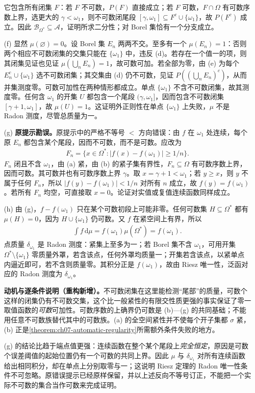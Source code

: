 \documentclass[../../main.tex]{subfiles}
\begin{document}
\begin{solution}
它包含所有闭集 $F$：若 $F$ 不可数，$P(F)$ 直接成立；若 $F$ 可数，$F\cap\Omega$ 有可数序数上界，选更大的 $\gamma<\omega_1$，则不可数闭尾段 $[\gamma,\omega_1]\subseteq F^c\cup\{\omega_1\}$，故 $P(F^c)$ 成立。因此 $\mathscr B_{\Omega^*}\subseteq\mathscr A$，证明所求二分性；对 Borel 集恰有一个分支成立。

(f) 显然 $\mu(\varnothing)=0$。设 Borel 集 $E_n$ 两两不交。至多有一个 $\mu(E_n)=1$：否则两个相应不可数闭集的交集只能在 $\{\omega_1\}$ 中，违反 (d)。若存在一个值一的项，则其闭集见证也见证 $\mu(\bigcup_nE_n)=1$，故可数可加。若全部为零，由 (e) 为每个 $E_n^c\cup\{\omega_1\}$ 选不可数闭集；其交集由 (d) 仍不可数，见证 $P((\bigcup_nE_n)^c)$，从而并集测度零。可数可加性在两种情形都成立。单点 $\{\omega_1\}$ 不含不可数闭集，故其测度零。任何含 $\omega_1$ 的开集 $U$ 都包含一个尾段 $(\gamma,\omega_1]$，因而包含不可数闭集 $[\gamma+1,\omega_1]$，故 $\mu(U)=1$。这证明外正则性在单点 $\{\omega_1\}$ 上失败，$\mu$ 不是 Radon 测度，尽管总质量为一。

(g) \textbf{原提示勘误。}原提示中的严格不等号 $<$ 方向错误：由 $f$ 在 $\omega_1$ 处连续，每个原 $E_n$ 都包含某个尾段，因而不可数，而不是可数。应改为
\begin{align*}
F_n=\{x\in\Omega^*:|f(x)-f(\omega_1)|\geqslant1/n\}.
\end{align*}
$F_n$ 闭且不含 $\omega_1$，由 (a) 紧，由 (b) 的紧子集有界性，$F_n\subseteq\Omega$ 有可数序数上界，因而可数。其可数并也有可数序数上界 $\gamma$。取 $x=\gamma+1<\omega_1$；若 $y\geqslant x$，则 $y$ 不属于任何 $F_n$，所以 $|f(y)-f(\omega_1)|<1/n$ 对所有 $n$ 成立，故 $f(y)=f(\omega_1)$。若所有 $F_n$ 均空，可直接取 $x=0$。论证对实值或复值连续函数同样成立。

(h) 由 (g)，$f-f(\omega_1)$ 只在某个可数初段上可能非零。任何可数集 $H\subseteq\Omega^*$ 都有 $\mu(H)=0$，因为 $H\cup\{\omega_1\}$ 仍可数。又 $f$ 在紧空间上有界，所以
\begin{align*}
\int f\,\mathrm d\mu=f(\omega_1)\mu(\Omega^*)=f(\omega_1).
\end{align*}
点质量 $\delta_{\omega_1}$ 是 Radon 测度：紧集上至多为一；若 Borel 集不含 $\omega_1$，可用开集 $\Omega^*\setminus\{\omega_1\}$ 零质量外罩，若含该点，任何外罩均质量一；开集若含该点，以紧单点内逼近即可，若不含则质量零。其积分正是 $f(\omega_1)$，故由 Riesz 唯一性，泛函对应的 Radon 测度为 $\delta_{\omega_1}$。
\end{solution}
\begin{remark}
\textbf{动机与逐条件说明（重构新增）。}不可数闭集在这里能检测“尾部”的质量，可数个这样的闭集仍有不可数交集，这个比一般紧性的有限交性质更强的事实保证了零一取值函数的\emph{可数}可加性。可数序数的上确界仍可数是 (b)—(g) 的共同基础；不能用任意不可数族替代其中的可数族。(a) 的全空间紧性并不使每个开子集都 $\sigma$ 紧，(b) 正是\cref{theorem:ch07-automatic-regularity}所需额外条件失败的地方。

(g) 的结论比趋于端点值更强：连续函数在整个某个尾段上\emph{完全恒定}，原因是可数个误差阈值的起始位置仍有一个可数的共同上界。因此 $\mu$ 与 $\delta_{\omega_1}$ 对所有连续函数给出相同积分，却在单点上分别取零与一；这说明 Riesz 定理的 Radon 唯一性条件不可忽略。原错误提示已经原样保留，并以上述反向不等号订正，不能把一个实际不可数的集合当作可数来完成证明。
\end{remark}
\end{document}
